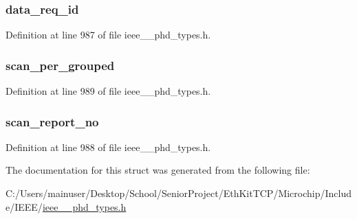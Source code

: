 \subsubsection[{data\+\_\+req\+\_\+id}]{ data\+\_\+req\+\_\+id}\label{struct___scan_report_info_m_p_grouped_ad3e167bbeac9d4b94b67cb6966e1f1fb}


Definition at line 987 of file ieee\+\_\+\_\+phd\+\_\+types.\+h.

\hypertarget{struct___scan_report_info_m_p_grouped_a4f77f70309e4d69f17ae86426cba5471}{}
\subsubsection[{scan\+\_\+per\+\_\+grouped}]{ scan\+\_\+per\+\_\+grouped}\label{struct___scan_report_info_m_p_grouped_a4f77f70309e4d69f17ae86426cba5471}


Definition at line 989 of file ieee\+\_\+\_\+phd\+\_\+types.\+h.

\hypertarget{struct___scan_report_info_m_p_grouped_a21f75132869d4d200ffe01d91b4736d8}{}
\subsubsection[{scan\+\_\+report\+\_\+no}]{ scan\+\_\+report\+\_\+no}\label{struct___scan_report_info_m_p_grouped_a21f75132869d4d200ffe01d91b4736d8}


Definition at line 988 of file ieee\+\_\+\_\+phd\+\_\+types.\+h.



The documentation for this struct was generated from the following file\+:\begin{DoxyCompactItemize}
\item 
C\+:/\+Users/mainuser/\+Desktop/\+School/\+Senior\+Project/\+Eth\+Kit\+T\+C\+P/\+Microchip/\+Include/\+I\+E\+E\+E/\hyperlink{ieee__11073__phd__types_8h}{ieee\+\_\+\_\+phd\+\_\+types.\+h}\end{DoxyCompactItemize}

